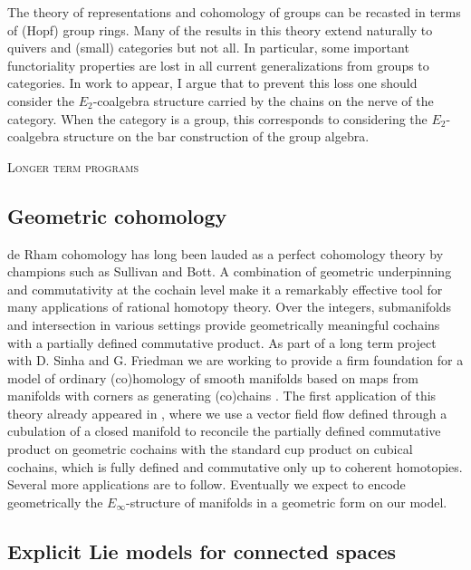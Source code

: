 The theory of representations and cohomology of groups can be recasted in terms of (Hopf) group rings.
Many of the results in this theory extend naturally to quivers and (small) categories but not all.
In particular, some important functoriality properties are lost in all current generalizations from groups to categories.
In work to appear, I argue that to prevent this loss one should consider the $E_2$-coalgebra structure carried by the chains on the nerve of the category.
When the category is a group, this corresponds to considering the $E_2$-coalgebra structure on the bar construction of the group algebra.

\vspace*{10pt} \noindent \textsc{Longer term programs}

\subsection{Geometric cohomology} \label{ss:geometric cohomology}

de Rham cohomology has long been lauded as a perfect cohomology theory by champions such as Sullivan and Bott.
A combination of geometric underpinning and commutativity at the cochain level make it a remarkably effective tool for many applications of rational homotopy theory.
Over the integers, submanifolds and intersection in various settings provide geometrically meaningful cochains with a partially defined commutative
product.
As part of a long term project with D. Sinha and G. Friedman we are working to provide a firm foundation for a model of ordinary (co)homology of smooth manifolds based on maps from manifolds with corners as generating (co)chains \cite{medina2021foundations}.
The first application of this theory already appeared in \cite{medina2021flowing}, where we use a vector field flow defined through a cubulation of a closed manifold to reconcile the partially defined commutative product on geometric cochains with the standard cup product on cubical cochains, which is fully defined and commutative only up to coherent homotopies.
Several more applications are to follow.
Eventually we expect to encode geometrically the $E_\infty$-structure of manifolds in a geometric form on our model.

\subsection{Explicit Lie models for connected spaces} \label{ss:lie models}

